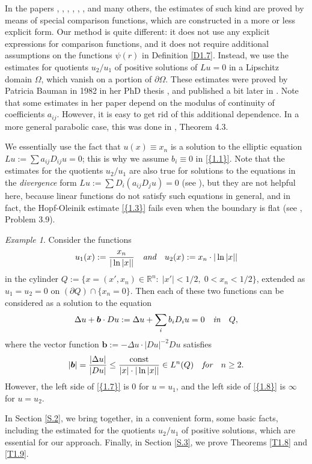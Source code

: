 \documentclass[regno,12pt]{amsart}
\theoremstyle{definition}
\theoremstyle{remark}
\newtheorem{example}[theorem]{Example}
\begin{document}
In the papers \cite{H52}, \cite{O52}, \cite{Kh69}, \cite{Kh70}, \cite{KH80}, \cite{L85}, and many others, the estimates of such kind are proved by means of special comparison functions, which are constructed in a more or less explicit form. Our method is quite different: it does not use any explicit expressions for comparison functions, and it  does not require additional assumptions on the functions $\psi(r)$ in Definition \ref{D1.7}. Instead, we use the estimates for quotients $u_2/u_1$ of positive solutions of $Lu=0$ in a Lipschitz domain $\Omega$, which vanish on a portion of ${\partial\Omega}$. These estimates were proved by Patricia  Bauman in 1982 in her PhD thesis \cite{B82}, and published a bit later in \cite{B84}. Note that some estimates in her paper depend on the modulus of continuity of coefficients $a_{ij}$. However, it is easy to get rid of this additional dependence. In a more general parabolic case, this was done in \cite{FSY}, Theorem 4.3.

We essentially use the fact that $u(x){\equiv} x_n$ is a solution to the elliptic equation $Lu:=\sum a_{ij}D_{ij}u=0$; this is why we assume $b_i{\equiv} 0$ in {\eqref{{1.1}}}. Note that the estimates for the quotients $u_2/u_1$ are also true for solutions to the equations in the \emph{divergence} form $Lu:=\sum D_i(a_{ij}D_ju)=0$ (see \cite{CFMS}), but they are not helpful here, because linear functions do not satisfy such equations in general, and in fact, the Hopf-Oleinik estimate {\eqref{{1.3}}} fails even when the boundary is flat (see \cite{GT}, Problem 3.9).

\begin{example}\label{E1.12}
    Consider the functions
    \[ u_1(x):=\frac{x_n}{|\ln|x||}
    {\quad\emph{{and}}\quad} u_2(x):=x_n\cdot |\ln|x||\]
    in the cylinder $Q:=\{x=(x',x_n)\in{{\mathbb R}^n}:\;|x'|<1/2,\;0<x_n<1/2\}$,
    extended as $u_1=u_2=0$ on $({\partial} Q)\cap \{x_n=0\}$. Then each of these two functions can be considered as a solution to the equation
    \[ \Delta u+{\bm{{b}}}\cdot Du:= \Delta u+\sum_i b_iD_iu=0
    {\quad\emph{{in}}\quad} Q,\]
    where the vector function ${\bm{{b}}}:=-\Delta u\cdot |Du|^{-2} Du$ satisfies
    \[ |{\bm{{b}}}| = \frac{|\Delta u|}{|Du|}
    \le \frac{{\rm const}}{|x|\cdot |\ln|x||}
    \in L^n(Q)
    {\quad\emph{{for}}\quad}n\ge 2.\]
    However, the left side of {\eqref{{1.7}}} is $0$ for $u=u_1$, and the left side of {\eqref{{1.8}}} is ${\infty}$ for $u=u_2$.
\end{example}

In Section \ref{S.2}, we bring together, in a convenient form, some basic facts, including the estimated for the quotients $u_2/u_1$ of positive solutions, which are essential for our approach. Finally, in Section \ref{S.3}, we prove Theorems \ref{T1.8} and \ref{T1.9}.
\medskip
\end{document}
